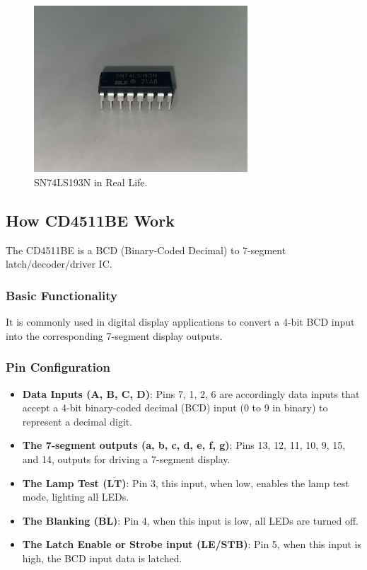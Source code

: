 \documentclass{article}
\begin{document}
\begin{figure}[h]
    \centering
    \includegraphics[width=8cm]{Pic/Pictures/193N real.jpg}
    \caption{SN74LS193N in Real Life.}
    \label{fig:enter-label}
\end{figure}



\newpage

\subsection{How CD4511BE Work}
The CD4511BE is a BCD (Binary-Coded Decimal) to 7-segment latch/decoder/driver IC. 

\subsubsection{Basic Functionality}
It is commonly used in digital display applications to convert a 4-bit BCD input into the corresponding 7-segment display outputs.\par

\subsubsection{Pin Configuration}
\begin{itemize}
    \item \textbf{Data Inputs (A, B, C, D)}: Pins 7, 1, 2, 6 are accordingly data inputs that accept a 4-bit binary-coded decimal (BCD) input (0 to 9 in binary) to represent a decimal digit.
    \item \textbf{The 7-segment outputs (a, b, c, d, e, f, g)}: Pins 13, 12, 11, 10, 9, 15, and 14, outputs for driving a 7-segment display.
    \item \textbf{The Lamp Test ($\overline{\textbf{LT}}$)}: Pin 3, this input, when low, enables the lamp test mode, lighting all LEDs.
    \item \textbf{The Blanking ($\overline{\textbf{BL}}$)}: Pin 4, when this input is low, all LEDs are turned off.
    \item \textbf{The Latch Enable or Strobe input (LE/$\overline{\textbf{STB}}$)}: Pin 5, when this input is high, the BCD input data is latched.
\end{itemize}
\end{document}
